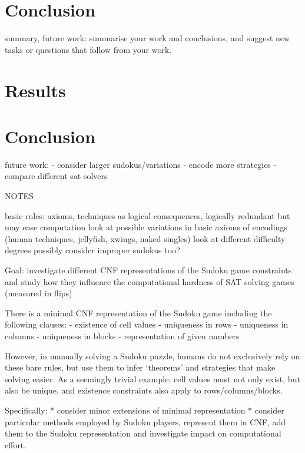 \documentclass[10pt,a4paper,leqno]{article}
\begin{document}
\section*{Conclusion} summary, future work: summarise your work and conclusions, and suggest new tasks or questions that follow from your work. 












\section*{Results}

\section*{Conclusion}

future work:
- consider larger sudokus/variations
- encode more strategies
- compare different sat solvers




NOTES

basic rules: axioms, techniques as logical consequences, logically redundant but may ease computation
	look at possible variations in basic axioms of
encodings (human techniques, jellyfish, xwings, naked singles)
look at different difficulty degrees
possibly consider improper sudokus too?

Goal: investigate different CNF representations of the Sudoku game constraints and study how they influence the computational hardness of SAT solving games (measured in flips)

There is a minimal CNF representation of the Sudoku game including the following clauses:
- existence of cell values
- uniqueness in rows
- uniqueness in columns
- uniqueness in blocks
- representation of given numbers

However, in manually solving a Sudoku puzzle, humans do not exclusively rely on these bare rules, but use them to infer ‘theorems’ and strategies that make solving easier.  As a seemingly trivial example: cell values must not only exist, but also be unique, and existence constraints also apply to rows/columns/blocks.

Specifically: 
* consider minor extensions of minimal representation 
* consider particular methods employed by Sudoku players, represent them in CNF, add them to the Sudoku representation and investigate impact on computational effort. 
\end{document}
